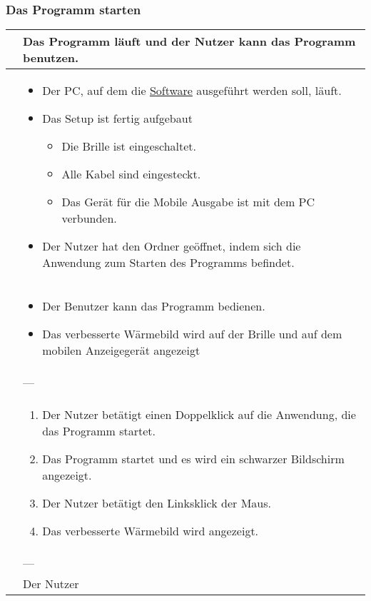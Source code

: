 \subsubsection{Das Programm starten}
\begin{center}
	\begin{longtable}{| p{3cm} | p{12cm} |}
		\hline
		\goal & Das Programm läuft und der Nutzer kann das Programm benutzen. \\ \hline
		
		\precondition & \begin{itemize}
			\item Der PC, auf dem die \hyperlink{tab:anwendung}{Software} ausgeführt werden soll, läuft.
			\item Das Setup ist fertig aufgebaut
			\begin{itemize}
				\item Die Brille ist eingeschaltet.
				\item Alle Kabel sind eingesteckt.
				\item Das Gerät für die Mobile Ausgabe ist mit dem PC verbunden.
			\end{itemize}
			\item Der Nutzer hat den Ordner geöffnet, indem sich die Anwendung zum Starten des Programms befindet.
		\end{itemize} \\ \hline
		
		\postcondition & \begin{itemize}
			\item Der Benutzer kann das Programm bedienen.
			\item Das verbesserte Wärmebild wird auf der Brille und auf dem mobilen Anzeigegerät angezeigt
		\end{itemize} \\ \hline
		
		\postexception & --- \\ \hline
		
		\flow & \begin{enumerate}
			\item Der Nutzer betätigt einen Doppelklick auf die Anwendung, die das Programm startet.
			\item Das Programm startet und es wird ein schwarzer Bildschirm angezeigt.
			\item Der Nutzer betätigt den Linksklick der Maus.
			\item Das verbesserte Wärmebild wird angezeigt.			
		\end{enumerate} \\ \hline
		
		\exception & --- \\ \hline
		
		\player & Der Nutzer \\
		\hline
	\end{longtable}
\end{center}

